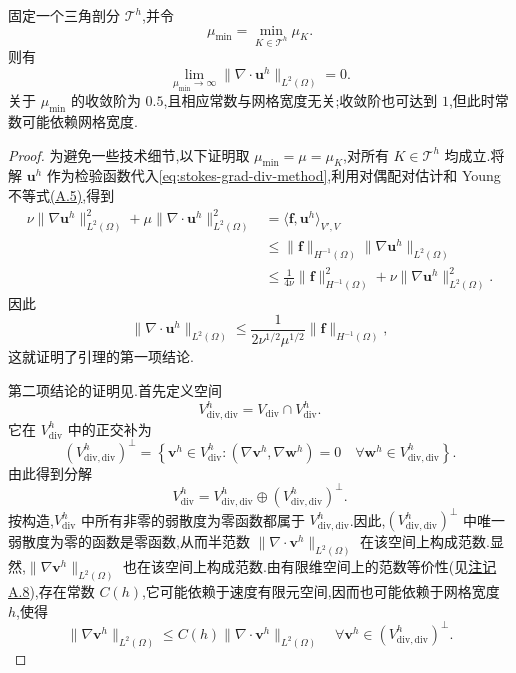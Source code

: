 \begin{lemma}[稳定化参数趋于无穷时散度范数趋于零]\label{lem:stokes-grad-div-divergence-vanishing}
固定一个三角剖分 $\mathcal{T}^h$,并令
\[
  \mu_{\min}=\min_{K\in\mathcal{T}^h}\mu_K.
\]
则有
\[
  \lim_{\mu_{\min}\to\infty}
  \|\nabla\cdot\bm{u}^h\|_{L^2(\Omega)}=0.
\]
关于 $\mu_{\min}$ 的收敛阶为 $0.5$,且相应常数与网格宽度无关;收敛阶也可达到 $1$,但此时常数可能依赖网格宽度.
\end{lemma}
\begin{proof}
为避免一些技术细节,以下证明取 $\mu_{\min}=\mu=\mu_K$,对所有 $K\in\mathcal{T}^h$ 均成立.将解 $\bm{u}^h$ 作为检验函数代入\cref{eq:stokes-grad-div-method},利用对偶配对估计和 Young 不等式\hyperref[eq:appendix-a-5]{(A.5)},得到
\begin{align*}
 \nu\|\nabla\bm{u}^h\|_{L^2(\Omega)}^2
  +\mu\|\nabla\cdot\bm{u}^h\|_{L^2(\Omega)}^2
 &=\langle\bm{f},\bm{u}^h\rangle_{V',V}\\
 &\le \|\bm{f}\|_{H^{-1}(\Omega)}
       \|\nabla\bm{u}^h\|_{L^2(\Omega)}\\
 &\le \frac{1}{4\nu}\|\bm{f}\|_{H^{-1}(\Omega)}^2
       +\nu\|\nabla\bm{u}^h\|_{L^2(\Omega)}^2.
\end{align*}
因此
\[
 \|\nabla\cdot\bm{u}^h\|_{L^2(\Omega)}
 \le \frac{1}{2\nu^{1/2}\mu^{1/2}}
       \|\bm{f}\|_{H^{-1}(\Omega)},
\]
这就证明了引理的第一项结论.

第二项结论的证明见\textcite{GalvinLinkeRebholzWilson2012}.首先定义空间
\begin{equation}\label{eq:stokes-grad-div-divergence-free-subspace}
 V_{\mathrm{div,div}}^h=V_{\mathrm{div}}\cap V_{\mathrm{div}}^h.
\end{equation}
它在 $V_{\mathrm{div}}^h$ 中的正交补为
\[
 (V_{\mathrm{div,div}}^h)^\perp
 =\left\{\bm{v}^h\in V_{\mathrm{div}}^h:
   (\nabla\bm{v}^h,\nabla\bm{w}^h)=0
   \quad\forall\bm{w}^h\in V_{\mathrm{div,div}}^h\right\}.
\]
由此得到分解
\[
 V_{\mathrm{div}}^h
 =V_{\mathrm{div,div}}^h\oplus(V_{\mathrm{div,div}}^h)^\perp.
\]
按构造,$V_{\mathrm{div}}^h$ 中所有非零的弱散度为零函数都属于 $V_{\mathrm{div,div}}^h$.因此,$(V_{\mathrm{div,div}}^h)^\perp$ 中唯一弱散度为零的函数是零函数,从而半范数 $\|\nabla\cdot\bm{v}^h\|_{L^2(\Omega)}$ 在该空间上构成范数.显然,$\|\nabla\bm{v}^h\|_{L^2(\Omega)}$ 也在该空间上构成范数.由有限维空间上的范数等价性(见\hyperref[note:appendix-a-8]{注记 A.8}),存在常数 $C(h)$,它可能依赖于速度有限元空间,因而也可能依赖于网格宽度 $h$,使得
\begin{equation}\label{eq:stokes-grad-div-complement-norm}
 \|\nabla\bm{v}^h\|_{L^2(\Omega)}
 \le C(h)\|\nabla\cdot\bm{v}^h\|_{L^2(\Omega)}
 \quad\forall\bm{v}^h\in(V_{\mathrm{div,div}}^h)^\perp.
\end{equation}


\end{proof}
